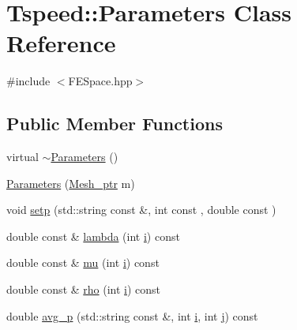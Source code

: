 \hypertarget{classTspeed_1_1Parameters}{\section{Tspeed\-:\-:Parameters Class Reference}
\label{classTspeed_1_1Parameters}
}


{\ttfamily \#include $<$F\-E\-Space.\-hpp$>$}

\subsection*{Public Member Functions}
\begin{DoxyCompactItemize}
\item 
virtual \hyperlink{classTspeed_1_1Parameters_ad15fb30d29239fb9d5f6ae2d95448e0b}{$\sim$\-Parameters} ()
\item 
\hyperlink{classTspeed_1_1Parameters_a9532e35c18436a3ffa9df32e5124b8cf}{Parameters} (\hyperlink{namespaceTspeed_a7367a01365c4cc2c1a09305b3effc4e8}{Mesh\-\_\-ptr} m)
\item 
void \hyperlink{classTspeed_1_1Parameters_a7ff1641236adefffc1a4883713b357a8}{setp} (std\-::string const \&, int const , double const )
\item 
double const \& \hyperlink{classTspeed_1_1Parameters_aec8ee931eddac3812e09db45a412685d}{lambda} (int \hyperlink{vtk__vector__out_8m_a6f6ccfcf58b31cb6412107d9d5281426}{i}) const 
\item 
double const \& \hyperlink{classTspeed_1_1Parameters_a4edca911ff34296039e07b9665ebcfa1}{mu} (int \hyperlink{vtk__vector__out_8m_a6f6ccfcf58b31cb6412107d9d5281426}{i}) const 
\item 
double const \& \hyperlink{classTspeed_1_1Parameters_ad111ae3220d2ff1c68130d9dee83665e}{rho} (int \hyperlink{vtk__vector__out_8m_a6f6ccfcf58b31cb6412107d9d5281426}{i}) const 
\item 
double \hyperlink{classTspeed_1_1Parameters_a70f5fb2033220a579d5c7228a231a619}{avg\-\_\-p} (std\-::string const \&, int \hyperlink{vtk__vector__out_8m_a6f6ccfcf58b31cb6412107d9d5281426}{i}, int \hyperlink{vtk__mesh__out_8m_af1af736f0a1475ea44566768103395cb}{j}) const 
\end{DoxyCompactItemize}


